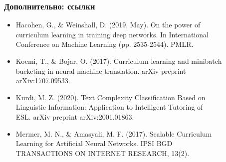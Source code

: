 \documentclass{beamer}
\begin{document}
\begin{frame}[label=supplemental,noframenumbering]
	\frametitle{Дополнительно: ссылки}
	\begin{itemize}
		\item Hacohen, G., \& Weinshall, D. (2019, May). On the power of \\\hspace{1cm}curriculum learning in training
		deep networks. In International\\\hspace{1cm}Conference on Machine Learning (pp. 2535-2544).
		PMLR.
		\item Kocmi, T., \& Bojar, O. (2017). Curriculum learning and minibatch \\\hspace{1cm}bucketing in neural
		machine translation. arXiv preprint \\\hspace{1cm}arXiv:1707.09533.
		\item Kurdi, M. Z. (2020). Text Complexity Classification Based on \\\hspace{1cm}Linguistic Information:
		Application to Intelligent Tutoring of \\\hspace{1cm}ESL. arXiv preprint arXiv:2001.01863.
		\item Mermer, M. N., \& Amasyali, M. F. (2017). Scalable Curriculum \\\hspace{1cm}Learning for Artificial
		Neural Networks. IPSI BGD \\\hspace{1cm}TRANSACTIONS ON INTERNET RESEARCH, 13(2).
	\end{itemize}
\end{frame}
\end{document}
